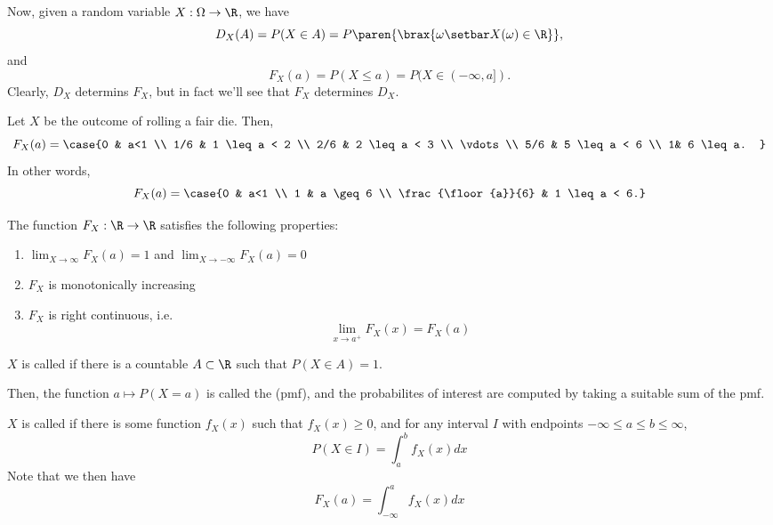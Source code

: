 \documentclass[11pt]{article}
\begin{document}
Now, given a random variable $X:\Omega \to \R$, we have
\[ D_X(A)= P (X \in A) = P\paren{\brax{\omega \setbar X(\omega) \in \R}},\]
and
\[F_X(a) = P(X \leq a) = P(X \in (-\infty, a]).\]
Clearly, $D_X$ determins $F_X$, but in fact we'll see that $F_X$ determines $D_X$.

\begin{ex}
    Let $X$ be the outcome of rolling a fair die. Then,
    \[ F_X(a) = \case{0 & a<1 \\ 1/6 & 1 \leq a < 2 \\ 2/6 & 2 \leq a < 3 \\ 
    \vdots \\ 5/6 & 5 \leq a < 6 \\ 1& 6 \leq a. } \]
    In other words,
    \[ F_X(a) = \case{0 & a<1 \\ 1 & a \geq 6 \\ \frac{\floor{a}}{6} & 1 \leq a < 6.} \]
\end{ex}

\begin{prop}
The function $F_X:\R \to \R$ satisfies the following properties:
\begin{enumerate}
    \item $\lim_{X \to \infty} F_X(a) = 1$ and $\lim_{X \to -\infty}F_X(a)=0$
    \item $F_X$ is monotonically increasing
    \item $F_X$ is right continuous, i.e. \[ \lim_{x \to a^+}F_X(x)=F_X(a) \]
\end{enumerate}
\end{prop}

\begin{defn}
    $X$ is called  if there is a countable $A \subset \R$ such that $P(X \in A)=1$.

    Then, the function $a \mapsto P(X=a)$ is called the  (pmf), and the probabilites of interest are computed by taking a suitable sum of the pmf.
\end{defn}

\begin{defn}
    $X$ is called  if there is some function $f_X(x)$ such that $f_X(x) \geq 0$, and for any interval $I$ with endpoints $-\infty \leq a \leq b \leq \infty$,
    \[
    P(X \in I) = \int_a^b f_X(x)dx
    \]
    Note that we then have
    \[
    F_X(a) = \int_{-\infty}^a f_X(x)dx
    \]
\end{defn}
\end{document}
